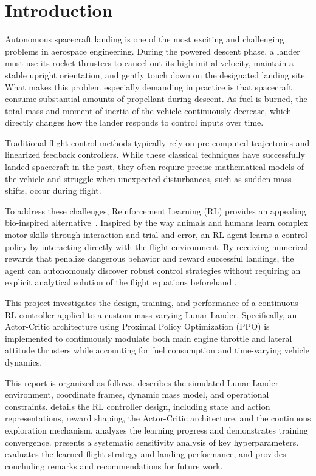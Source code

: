\newpage
\section{Introduction}
\label{sec:introduction}

Autonomous spacecraft landing is one of the most exciting and challenging problems in aerospace engineering. During the powered descent phase, a lander must use its rocket thrusters to cancel out its high initial velocity, maintain a stable upright orientation, and gently touch down on the designated landing site. What makes this problem especially demanding in practice is that spacecraft consume substantial amounts of propellant during descent. As fuel is burned, the total mass and moment of inertia of the vehicle continuously decrease, which directly changes how the lander responds to control inputs over time.

Traditional flight control methods typically rely on pre-computed trajectories and linearized feedback controllers. While these classical techniques have successfully landed spacecraft in the past, they often require precise mathematical models of the vehicle and struggle when unexpected disturbances, such as sudden mass shifts, occur during flight.

To address these challenges, Reinforcement Learning (RL) provides an appealing bio-inspired alternative~\cite{vankampen2025lecture}. Inspired by the way animals and humans learn complex motor skills through interaction and trial-and-error, an RL agent learns a control policy by interacting directly with the flight environment. By receiving numerical rewards that penalize dangerous behavior and reward successful landings, the agent can autonomously discover robust control strategies without requiring an explicit analytical solution of the flight equations beforehand \cite{sutton2018reinforcement}.

This project investigates the design, training, and performance of a continuous RL controller applied to a custom mass-varying Lunar Lander. Specifically, an Actor-Critic architecture using Proximal Policy Optimization (PPO) \cite{schulman2017proximal} is implemented to continuously modulate both main engine throttle and lateral attitude thrusters while accounting for fuel consumption and time-varying vehicle dynamics.

This report is organized as follows.  describes the simulated Lunar Lander environment, coordinate frames, dynamic mass model, and operational constraints.  details the RL controller design, including state and action representations, reward shaping, the Actor-Critic architecture, and the continuous exploration mechanism.  analyzes the learning progress and demonstrates training convergence.  presents a systematic sensitivity analysis of key hyperparameters.  evaluates the learned flight strategy and landing performance, and  provides concluding remarks and recommendations for future work.

